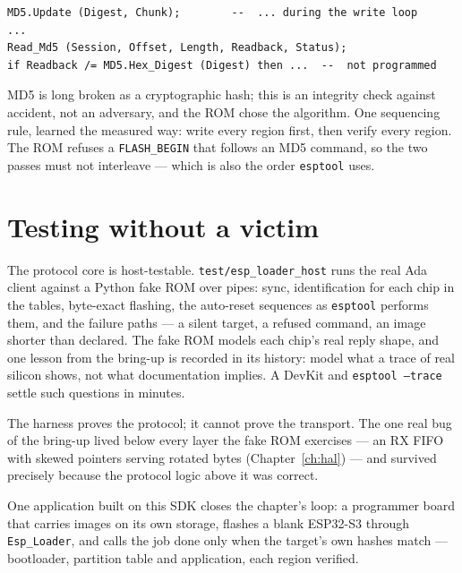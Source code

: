 \begin{lstlisting}
MD5.Update (Digest, Chunk);        --  ... during the write loop
...
Read_Md5 (Session, Offset, Length, Readback, Status);
if Readback /= MD5.Hex_Digest (Digest) then ...  --  not programmed
\end{lstlisting}

MD5 is long broken as a cryptographic hash; this is an integrity check against
accident, not an adversary, and the ROM chose the algorithm. One sequencing
rule, learned the measured way: write every region first, then verify every
region. The ROM refuses a \texttt{FLASH\_BEGIN} that follows an MD5 command,
so the two passes must not interleave --- which is also the order
\texttt{esptool} uses.

\section{Testing without a victim}

The protocol core is host-testable. \texttt{test/esp\_loader\_host} runs the
real Ada client against a Python fake ROM over pipes: sync, identification for
each chip in the tables, byte-exact flashing, the auto-reset sequences as
\texttt{esptool} performs them, and the failure paths --- a silent target, a
refused command, an image shorter than declared. The fake ROM models each
chip's real reply shape, and one lesson from the bring-up is recorded in its
history: model what a trace of real silicon shows, not what documentation
implies. A DevKit and \texttt{esptool --trace} settle such questions in
minutes.

The harness proves the protocol; it cannot prove the transport. The one real
bug of the bring-up lived below every layer the fake ROM exercises --- an RX
FIFO with skewed pointers serving rotated bytes (Chapter~\ref{ch:hal}) --- and
survived precisely because the protocol logic above it was correct.

\medskip
\noindent One application built on this SDK closes the chapter's loop: a
programmer board that carries images on its own storage, flashes a blank
ESP32-S3 through \texttt{Esp\_Loader}, and calls the job done only when the
target's own hashes match --- bootloader, partition table and application,
each region verified.
